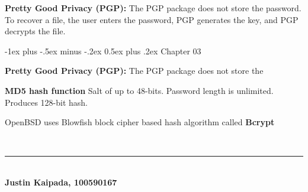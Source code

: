 \documentclass[10pt,landscape]{article}
\makeatletter
\renewcommand{\section}{\@startsection{section}{1}{0mm}%
    {-1ex plus -.5ex minus -.2ex}%
    {0.5ex plus .2ex}%
    {\normalfont\large\bfseries}}
\makeatother
\begin{document}
\begin{multicols}{3}
\textbf{Pretty Good Privacy (PGP):} The PGP package does not store the
password. To recover a file, the user enters the password, PGP
generates the key, and PGP decrypts the file.

\section{Chapter 03}


\textbf{Pretty Good Privacy (PGP):} The PGP package does not store the

\textbf{MD5 hash function} Salt of up to 48-bits.  Password length is unlimited.  Produces 128-bit
hash.

OpenBSD uses Blowfish block cipher based hash algorithm called \textbf{Bcrypt}

~\\

\vfill
\hrule
~\\
\textbf{Justin Kaipada, 100590167}
\end{multicols}
\end{document}
